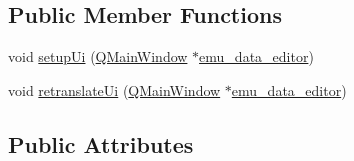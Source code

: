 \subsection*{Public Member Functions}
\begin{DoxyCompactItemize}
\item 
void \hyperlink{a00026_a33af8ac054888d9cc0833b699028b690}{setup\+Ui} (\hyperlink{a00010}{Q\+Main\+Window} $\ast$\hyperlink{a00004}{emu\+\_\+data\+\_\+editor})
\item 
void \hyperlink{a00026_a4118bb421fd84731231aa1429fedf5f8}{retranslate\+Ui} (\hyperlink{a00010}{Q\+Main\+Window} $\ast$\hyperlink{a00004}{emu\+\_\+data\+\_\+editor})
\end{DoxyCompactItemize}
\subsection*{Public Attributes}
